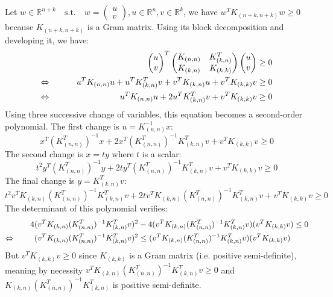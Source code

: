 Let $w \in \mathbb{R}^{n+k} \quad \text{s.t.} \quad w = \begin{pmatrix}
    u \\
    v
  \end{pmatrix}, u \in \mathbb{R}^n, v \in \mathbb{R}^k$, we have $w^T K_{(n+k,n+k)} w \geq 0$ because $K_{(n+k,n+k)}$ is a Gram matrix. Using its block decomposition and developing it, we have:
\begin{alignat*}{2}
  &&\begin{pmatrix}
    u \\
    v
  \end{pmatrix} ^T
  \begin{pmatrix}
    K_{(n,n)} & K_{(k,n)}^T \\
    K_{(k,n)} & K_{(k,k)}
  \end{pmatrix}
  \begin{pmatrix}
    u \\
    v
  \end{pmatrix}
  &\geq 0 \\
  \Leftrightarrow\mkern40mu
  &&u^T K_{(n,n)} u + u^T K_{(k,n)}^T v +
  v^T K_{(k,n)} u + v^T K_{(k,k)} v
  &\geq 0 \\
  \Leftrightarrow\mkern40mu
  &&u^T K_{(n,n)} u + 
  2 u^T K_{(k,n)}^T v +
  v^T K_{(k,k)} v
  &\geq 0
\end{alignat*}
Using three successive change of variables, this equation becomes a second-order polynomial. The first change is $u = K_{(n,n)}^{-1} x$:
\begin{equation*}
  x^T (K_{(n,n)}^T)^{-1} x + 
  2 x^T (K_{(n,n)}^T)^{-1} K_{(k,n)}^T v +
  v^T K_{(k,k)} v
  \geq 0
\end{equation*}
The second change is $x = t y$ where $t$ is a scalar:
\begin{equation*}
  t^2 y^T (K_{(n,n)}^T)^{-1} y + 
  2 t y^T (K_{(n,n)}^T)^{-1} K_{(k,n)}^T v +
  v^T K_{(k,k)} v
  \geq 0
\end{equation*}
The final change is $y = K_{(k,n)}^T v$:
\begin{equation*}
  t^2 v^T K_{(k,n)} (K_{(n,n)}^T)^{-1} K_{(k,n)}^T v + 
  2 t v^T K_{(k,n)} (K_{(n,n)}^T)^{-1} K_{(k,n)}^T v +
  v^T K_{(k,k)} v
  \geq 0
\end{equation*}
The determinant of this polynomial verifies:
\begin{alignat*}{2}
  &&4 (v^T K_{(k,n)} (K_{(n,n)}^T)^{-1} K_{(k,n)}^T v)^2 &-
  4 (v^T K_{(k,n)} (K_{(n,n)}^T)^{-1} K_{(k,n)}^T v)
  (v^T K_{(k,k)} v)
  \leq 0 \\
  \Leftrightarrow\mkern20mu
  &&(v^T K_{(k,n)} (K_{(n,n)}^T)^{-1} K_{(k,n)}^T v)^2
  &\leq 
  (v^T K_{(k,n)} (K_{(n,n)}^T)^{-1} K_{(k,n)}^T v)
  (v^T K_{(k,k)} v)
\end{alignat*}
But $v^T K_{(k,k)} v \geq 0$ since $ K_{(k,k)}$ is a Gram matrix (i.e. positive semi-definite), meaning by necessity $v^T K_{(k,n)} (K_{(n,n)}^T)^{-1} K_{(k,n)}^T v \geq 0$ and $K_{(k,n)} (K_{(n,n)}^T)^{-1} K_{(k,n)}^T$ is positive semi-definite.

